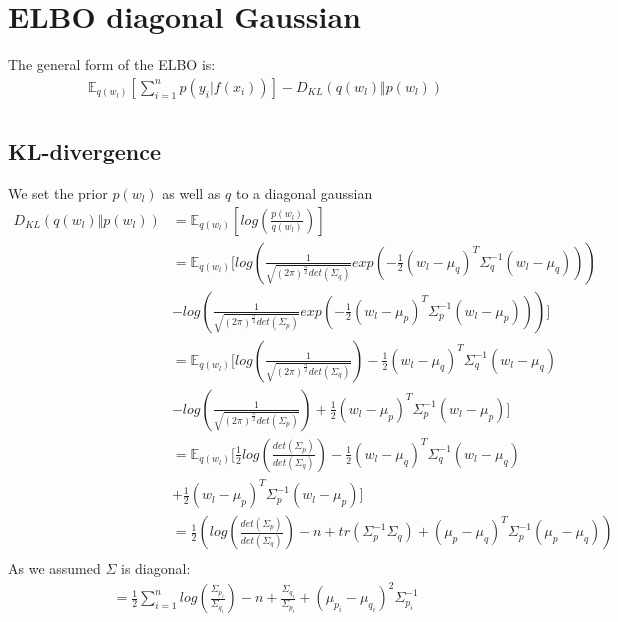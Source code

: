 \documentclass[a4paper]{scrartcl}
\begin{document}
\section{ELBO diagonal Gaussian}
    The general form of the ELBO is:
    \begin{align*}
        & \mathbb{E}_{q(w_l)}[\sum_{i=1}^n p(y_i \vert f(x_i))] - D_{KL}(q(w_l) \Vert p(w_l))\\
    \end{align*}

\subsection{KL-divergence}
    We set the prior $p(w_l)$ as well as $q$ to a diagonal gaussian
    \begin{align*}
        D_{KL}(q(w_l) \Vert p(w_l))
        &= \mathbb{E}_{q(w_l)} [log(\frac{p(w_l)}{q(w_l)})] \\
        &= \mathbb{E}_{q(w_l)} [log(\frac{1}{\sqrt{(2 \pi)^{\frac{n}{2}} det(\Sigma_q)}} exp(-\frac{1}{2} (w_l - \mu_q)^T \Sigma^{-1}_q (w_l - \mu_q)))\\
        &- log(\frac{1}{\sqrt{(2 \pi)^{\frac{n}{2}} det(\Sigma_p)}} exp(-\frac{1}{2} (w_l - \mu_p)^T \Sigma^{-1}_p (w_l - \mu_p)))] \\
        &= \mathbb{E}_{q(w_l)} [log(\frac{1}{\sqrt{(2 \pi)^{\frac{n}{2}} det(\Sigma_q)}}) -\frac{1}{2} (w_l - \mu_q)^T \Sigma^{-1}_q (w_l - \mu_q)\\
        &- log(\frac{1}{\sqrt{(2 \pi)^{\frac{n}{2}} det(\Sigma_p)}}) + \frac{1}{2} (w_l - \mu_p)^T \Sigma^{-1}_p (w_l - \mu_p)] \\
        &= \mathbb{E}_{q(w_l)} [\frac{1}{2}log(\frac{det(\Sigma_p)}{det(\Sigma_q)}) -\frac{1}{2} (w_l - \mu_q)^T \Sigma^{-1}_q (w_l - \mu_q)\\
        & + \frac{1}{2} (w_l - \mu_p)^T \Sigma^{-1}_p (w_l - \mu_p)] \\
        &= \frac{1}{2}(log(\frac{det(\Sigma_p)}{det(\Sigma_q)}) -n + tr(\Sigma^{-1}_p \Sigma_q ) + (\mu_p - \mu_q)^T \Sigma^{-1}_p (\mu_p - \mu_q))\\
    \end{align*}
    As we assumed $\Sigma$ is diagonal:
    \begin{align}
        &= \frac{1}{2} \sum_{i=1}^n log(\frac{ \Sigma_{p_i}}{\Sigma_{q_i}}) - n + \frac{\Sigma_{q_i}}{\Sigma_{p_i}}  +  (\mu_{p_i} - \mu_{q_i})^2 \Sigma^{-1}_{p_i}
    \end{align}
\end{document}
